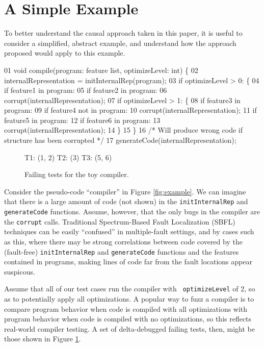 \section{A Simple Example}
\label{sec:example}

To better understand the causal approach taken in this paper, it is useful to consider a simplified, abstract example, and understand how the approach proposed would apply to this example.

\begin{figure*}
\begin{code}
 01  void compile(program: feature list, optimizeLevel: int) \{
 02    internalRepresentation = initInternalRep(program);
 03    if optimizeLevel > 0: \{
 04       if feature1 in program:
 05          if feature2 in program:
 06             corrupt(internalRepresentation);
 07       if optimizeLevel > 1: \{
 08          if feature3 in program:
 09             if feature4 not in program:
 10                corrupt(internalRepresentation);
 11          if feature5 in program:
 12             if feature6 in program:
 13                corrupt(internalRepresentation);
 14       \}
 15    \}
 16    /* Will produce wrong code if structure has been corrupted */
 17    generateCode(internalRepresentation);
\end{code}
\caption{A toy ``optimizing compiler'' with multiple bugs}
\label{fig:example}
\end{figure*}

\begin{figure}
\begin{code}
T1: (1, 2)
T2: (3)
T3: (5, 6)
\end{code}
\caption{Failing tests for the toy compiler.}
\label{fig:toybugs}
\end{figure}

Consider the pseudo-code ``compiler'' in Figure \ref{fig:example}.  We can imagine that there is a large amount of code (not shown) in the {\tt initInternalRep} and {\tt generateCode} functions.  Assume, however, that the only bugs in the compiler are the {\tt corrupt} calls.  Traditional Spectrum-Based Fault Localization (SBFL) techniques can be easily ``confused'' in multiple-fault settings, and by cases such as this, where there may be strong correlations between code covered by the (fault-free) {\tt initInternalRep} and {\tt generateCode} functions and the features contained in programs, making lines of code far from the fault locations appear suspicous.

Assume that all of our test cases run the compiler with {\tt
  optimizeLevel} of 2, so as to potentially apply all optimizations.
A popular way to fuzz a compiler is to compare program behavior when
code is compiled with all optimizations with program behavior when
code is compiled with no optimizations, so this reflects real-world compiler testing.  A set of delta-debugged failing tests, then, might be those shown in Figure \ref{fig:toybugs}.

